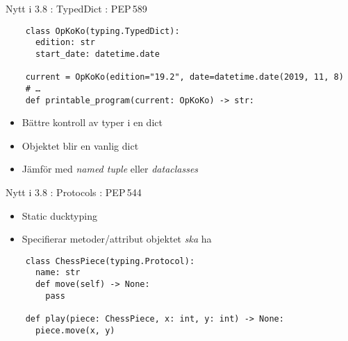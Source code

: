 \begin{frame}[fragile]{Nytt i 3.8 : TypedDict : PEP\,589}

  \begin{verbatim}
    class OpKoKo(typing.TypedDict):
      edition: str
      start_date: datetime.date

    current = OpKoKo(edition="19.2", date=datetime.date(2019, 11, 8)
    # …
    def printable_program(current: OpKoKo) -> str:
  \end{verbatim}

  \begin{itemize}
    \item Bättre kontroll av typer i en dict
    \item Objektet blir en vanlig dict
    \item Jämför med \emph{named tuple} eller \emph{dataclasses}
  \end{itemize}
\end{frame}

\begin{frame}[fragile]{Nytt i 3.8 : Protocols : PEP\,544}
  \begin{itemize}
    \item Static ducktyping
    \item Specifierar metoder/attribut objektet \emph{ska} ha
  \end{itemize}

  \begin{verbatim}
    class ChessPiece(typing.Protocol):
      name: str
      def move(self) -> None:
        pass

    def play(piece: ChessPiece, x: int, y: int) -> None:
      piece.move(x, y)
  \end{verbatim}
\end{frame}
